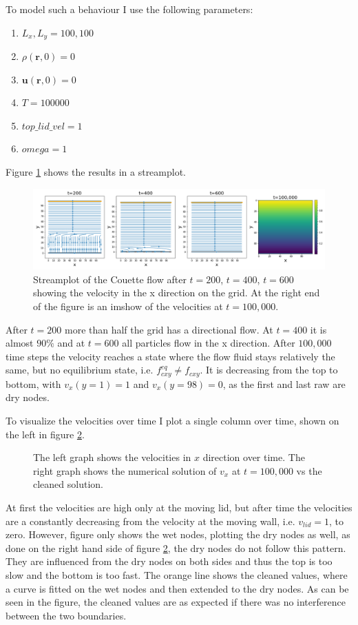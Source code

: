 \documentclass[a4paper,11pt, oneside]{book}
\begin{document}
To model such a behaviour I use the following parameters:
\begin{enumerate}
    \item $L_{x}, L_{y} = 100, 100$
    \item $\rho(\textbf{r}, 0) = 0$
    \item $\textbf{u}(\textbf{r}, 0) = 0$
    \item $T = 100000$
    \item $top\_lid\_vel = 1$
    \item $omega = 1$
\end{enumerate}
Figure \ref{fig:m4-1-streamplot} shows the results in a streamplot.
\begin{figure}[ht]
\centering
\includegraphics[width=\columnwidth]{milestones/final/img/m4-1-streamplot.png}
\vspace*{-4mm}
\caption[Couette flow ]{Streamplot of the Couette flow after $t=200$, $t=400$, $t=600$ showing the velocity in the x direction on the grid. At the right end of the figure is an imshow of the velocities at $t=100,000$.}
\label{fig:m4-1-streamplot}
\end{figure}
After $t=200$ more than half the grid has a directional flow. At $t=400$ it is almost $90\%$ and at $t=600$ all particles flow in the x direction. After $100,000$ time steps the velocity reaches a state where the flow fluid stays relatively the same, but no equilibrium state, i.e. $f^{eq}_{cxy}\neq f_{cxy}$. 
It is decreasing from the top to bottom, with $v_{x}(y=1)=1$ and $v_{x}(y=98)=0$, as the first and last raw are dry nodes.

To visualize the velocities over time I plot a single column over time, shown on the left in figure \ref{fig:m4-1-velocities-over-time}.
\begin{figure}[ht]
\centering
\resizebox{\columnwidth}{!}{\large}
\caption[Column velocities over time]{The left graph shows the velocities in $x$ direction over time. The right graph shows the numerical solution of $v_{x}$ at $t=100,000$ vs the cleaned solution.}
\label{fig:m4-1-velocities-over-time}
\end{figure}
At first the velocities are high only at the moving lid, but after time the velocities are a constantly decreasing from the velocity at the moving wall, i.e. $v_{lid}=1$, to zero.
However, figure only shows the wet nodes, plotting the dry nodes as well, as done on the right hand side of figure \ref{fig:m4-1-velocities-over-time}, the dry nodes do not follow this pattern. They are influenced from the dry nodes on both sides and thus the top is too slow and the bottom is too fast.
The orange line shows the cleaned values, where a curve is fitted on the wet nodes and then extended to the dry nodes. As can be seen in the figure, the cleaned values are as expected if there was no interference between the two boundaries.
\end{document}
